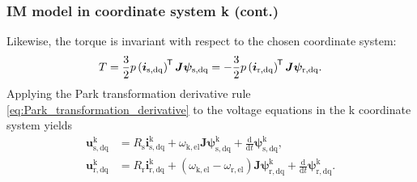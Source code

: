 \begin{frame}
	\frametitle{IM model in coordinate system k (cont.)}
    Likewise, the torque is invariant with respect to the chosen coordinate system:
    \begin{equation}
        T = \frac{3}{2} p \left(\bm{i}_\mathrm{s,dq}\right)^{\mkern-1.5mu\mathsf{T}}\bm{J}\bm{\psi}_\mathrm{s,dq} = -\frac{3}{2} p \left(\bm{i}_\mathrm{r,dq}\right)^{\mkern-1.5mu\mathsf{T}}\bm{J}\bm{\psi}_\mathrm{r,dq}.
    \end{equation}
    Applying the Park transformation derivative rule \eqref{eq:Park_transformation_derivative} to the voltage equations in the k coordinate system yields
    \begin{equation}
        \begin{alignedat}{2}
            \bm{u}^\mathrm{k}_\mathrm{s,dq} &= R_\mathrm{s} \bm{i}^\mathrm{k}_\mathrm{s,dq} + \omega_\mathrm{k,el}\bm{J} \bm{\psi}^\mathrm{k}_\mathrm{s,dq} + \frac{\mathrm{d}}{\mathrm{d}t}\bm{\psi}^\mathrm{k}_\mathrm{s,dq},\\
            \bm{u}^\mathrm{k}_\mathrm{r,dq} &= R_\mathrm{r} \bm{i}^\mathrm{k}_\mathrm{r,dq} +\left(\omega_\mathrm{k,el}-\omega_\mathrm{r,el}\right)\bm{J}\bm{\psi}^\mathrm{k}_\mathrm{r,dq} + \frac{\mathrm{d}}{\mathrm{d}t}\bm{\psi}^\mathrm{k}_\mathrm{r,dq}.
        \end{alignedat}
    \end{equation}
\end{frame}

